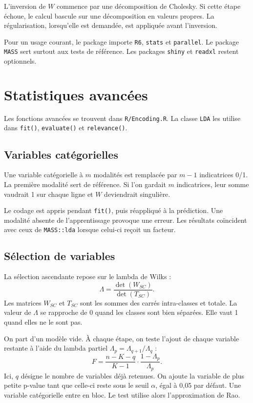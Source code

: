 \documentclass[11pt,a4paper]{article}
\begin{document}
L'inversion de \(W\) commence par une d\'ecomposition de Cholesky. Si cette
\'etape \'echoue, le calcul bascule sur une d\'ecomposition en valeurs propres.
La r\'egularisation, lorsqu'elle est demand\'ee, est appliqu\'ee avant
l'inversion.

Pour un usage courant, le package importe \texttt{R6}, \texttt{stats} et
\texttt{parallel}. Le package \texttt{MASS} sert surtout aux tests de
r\'ef\'erence. Les packages \texttt{shiny} et \texttt{readxl} restent
optionnels.

\section{Statistiques avanc\'ees}
\label{sec:avancees}

Les fonctions avanc\'ees se trouvent dans \texttt{R/Encoding.R}. La classe
\texttt{LDA} les utilise dans \texttt{fit()}, \texttt{evaluate()} et
\texttt{relevance()}.

\subsection{Variables cat\'egorielles}

Une variable cat\'egorielle \`a \(m\) modalit\'es est remplac\'ee par \(m-1\)
indicatrices 0/1. La premi\`ere modalit\'e sert de r\'ef\'erence. Si l'on
gardait \(m\) indicatrices, leur somme vaudrait 1 sur chaque ligne et \(W\)
deviendrait singuli\`ere.

Le codage est appris pendant \texttt{fit()}, puis r\'eappliqu\'e \`a la
pr\'ediction. Une modalit\'e absente de l'apprentissage provoque une erreur.
Les r\'esultats co\"incident avec ceux de \texttt{MASS::lda} lorsque celui-ci
re\c{c}oit un facteur.

\subsection{S\'election de variables}

La s\'election ascendante repose sur le lambda de Wilks :
\begin{equation}
  \Lambda = \frac{\det(W_{SC})}{\det(T_{SC})}.
\end{equation}
Les matrices \(W_{SC}\) et \(T_{SC}\) sont les sommes des carr\'es
intra-classes et totale. La valeur de \(\Lambda\) se rapproche de 0 quand les
classes sont bien s\'epar\'ees. Elle vaut 1 quand elles ne le sont pas.

On part d'un mod\`ele vide. \`A chaque \'etape, on teste l'ajout de chaque
variable restante \`a l'aide du lambda partiel
\(\Lambda_p = \Lambda_{q+1} / \Lambda_q\) :
\begin{equation}
  F = \frac{n - K - q}{K - 1} \cdot \frac{1 - \Lambda_p}{\Lambda_p}.
\end{equation}
Ici, \(q\) d\'esigne le nombre de variables d\'ej\`a retenues. On ajoute la
variable de plus petite p-value tant que celle-ci reste sous le seuil
\(\alpha\), \'egal \`a 0{,}05 par d\'efaut. Une variable cat\'egorielle entre
en bloc. Le test utilise alors l'approximation de Rao.
\end{document}
